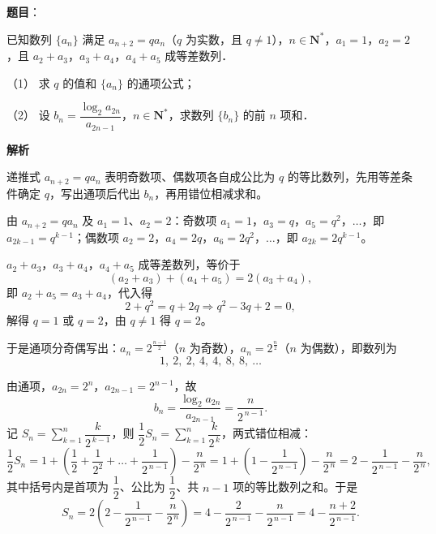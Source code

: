 \begin{answer}

\textbf{题目}：

已知数列 \(\{a_n\}\) 满足 \(a_{n+2}=qa_n\)（\(q\) 为实数，且 \(q\neq1\)），\(n\in\mathbf{N}^{*}\)，\(a_1=1\)，\(a_2=2\)，且 \(a_2+a_3\)，\(a_3+a_4\)，\(a_4+a_5\) 成等差数列．

（1） 求 \(q\) 的值和 \(\{a_n\}\) 的通项公式；

（2） 设 \(b_n=\dfrac{\log_2 a_{2n}}{a_{2n-1}}\)，\(n\in\mathbf{N}^{*}\)，求数列 \(\{b_n\}\) 的前 \(n\) 项和．

\textbf{解析}

递推式 \(a_{n+2}=qa_{n}\) 表明奇数项、偶数项各自成公比为 \(q\) 的等比数列，先用等差条件确定 \(q\)，写出通项后代出 \(b_{n}\)，再用错位相减求和。


由 \(a_{n+2}=qa_{n}\) 及 \(a_{1}=1\)、\(a_{2}=2\)：奇数项 \(a_{1}=1\)，\(a_{3}=q\)，\(a_{5}=q^{2}\)，\(\dots\)，即 \(a_{2k-1}=q^{k-1}\)；偶数项 \(a_{2}=2\)，\(a_{4}=2q\)，\(a_{6}=2q^{2}\)，\(\dots\)，即 \(a_{2k}=2q^{k-1}\)。

\(a_{2}+a_{3}\)，\(a_{3}+a_{4}\)，\(a_{4}+a_{5}\) 成等差数列，等价于
\nopagebreak[4]
\[
(a_{2}+a_{3})+(a_{4}+a_{5})=2(a_{3}+a_{4}),
\]
即 \(a_{2}+a_{5}=a_{3}+a_{4}\)，代入得
\nopagebreak[4]
\[
2+q^{2}=q+2q \Longrightarrow q^{2}-3q+2=0,
\]
解得 \(q=1\) 或 \(q=2\)，由 \(q\neq1\) 得 \(q=2\)。

于是通项分奇偶写出：\(a_{n}=2^{\frac{n-1}{2}}\)（\(n\) 为奇数），\(a_{n}=2^{\frac{n}{2}}\)（\(n\) 为偶数），即数列为
\nopagebreak[4]
\[
1,\ 2,\ 2,\ 4,\ 4,\ 8,\ 8,\ \dots
\]


由通项，\(a_{2n}=2^{n}\)，\(a_{2n-1}=2^{n-1}\)，故
\nopagebreak[4]
\[
b_{n}=\dfrac{\log_{2}a_{2n}}{a_{2n-1}}=\dfrac{n}{2^{\,n-1}} .
\]
记 \(S_{n}=\sum\limits_{k=1}^{n}\dfrac{k}{2^{\,k-1}}\)，则 \(\dfrac{1}{2}S_{n}=\sum\limits_{k=1}^{n}\dfrac{k}{2^{\,k}}\)，两式错位相减：
\nopagebreak[4]
\[
\dfrac{1}{2}S_{n}=1+\left(\dfrac{1}{2}+\dfrac{1}{2^{2}}+\dots+\dfrac{1}{2^{\,n-1}}\right)-\dfrac{n}{2^{\,n}}
=1+\left(1-\dfrac{1}{2^{\,n-1}}\right)-\dfrac{n}{2^{\,n}}
=2-\dfrac{1}{2^{\,n-1}}-\dfrac{n}{2^{\,n}},
\]
其中括号内是首项为 \(\dfrac{1}{2}\)、公比为 \(\dfrac{1}{2}\)、共 \(n-1\) 项的等比数列之和。于是
\nopagebreak[4]
\[
S_{n}=2\left(2-\dfrac{1}{2^{\,n-1}}-\dfrac{n}{2^{\,n}}\right)
=4-\dfrac{2}{2^{\,n-1}}-\dfrac{n}{2^{\,n-1}}=4-\dfrac{n+2}{2^{\,n-1}} .
\]


\end{answer}
